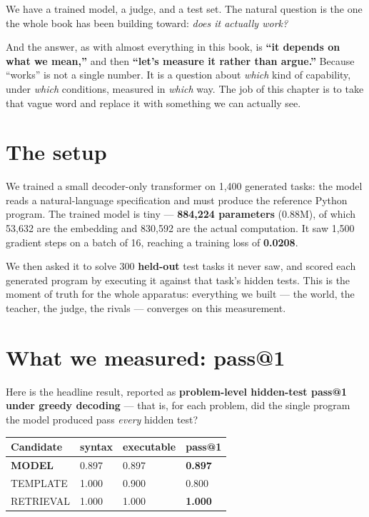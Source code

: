 We have a trained model, a judge, and a test set. The natural question
is the one the whole book has been building toward: \emph{does it
actually work?}

And the answer, as with almost everything in this book, is \textbf{``it
depends on what we mean,''} and then \textbf{``let's measure it rather
than argue.''} Because ``works'' is not a single number. It is a
question about \emph{which} kind of capability, under \emph{which}
conditions, measured in \emph{which} way. The job of this chapter is to
take that vague word and replace it with something we can actually see.

\section{The setup}\label{the-setup}

We trained a small decoder-only transformer on 1,400 generated tasks:
the model reads a natural-language specification and must produce the
reference Python program. The trained model is tiny --- \textbf{884,224
parameters} (0.88M), of which 53,632 are the embedding and 830,592 are
the actual computation. It saw 1,500 gradient steps on a batch of 16,
reaching a training loss of \textbf{0.0208}.

We then asked it to solve 300 \textbf{held-out} test tasks it never saw,
and scored each generated program by executing it against that task's
hidden tests. This is the moment of truth for the whole apparatus:
everything we built --- the world, the teacher, the judge, the rivals
--- converges on this measurement.

\section{What we measured: pass@1}\label{what-we-measured-pass1}

Here is the headline result, reported as \textbf{problem-level
hidden-test pass@1 under greedy decoding} --- that is, for each problem,
did the single program the model produced pass \emph{every} hidden test?

\begin{longtable}[]{@{}llll@{}}
\toprule\noalign{}
Candidate & syntax & executable & \textbf{pass@1} \\
\midrule\noalign{}
\endhead
\bottomrule\noalign{}
\endlastfoot
\textbf{MODEL} & 0.897 & 0.897 & \textbf{0.897} \\
TEMPLATE & 1.000 & 0.900 & 0.800 \\
RETRIEVAL & 1.000 & 1.000 & \textbf{1.000} \\
\end{longtable}

